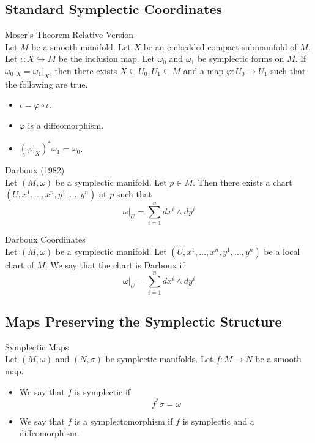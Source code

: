 \documentclass[a4paper]{article}
\begin{document}
\subsection{Standard Symplectic Coordinates}
\begin{thm}{Moser's Theorem Relative Version}{}\\
Let $M$ be a smooth manifold. Let $X$ be an embedded compact submanifold of $M$. Let $\iota:X\hookrightarrow M$ be the inclusion map. Let $\omega_0$ and $\omega_1$ be symplectic forms on $M$. If $\omega_0|_X=\omega_1|_X$, then there exists $X\subseteq U_0,U_1\subseteq M$ and a map $\varphi:U_0\to U_1$ such that the following are true. 
\begin{itemize}
\item $\iota=\varphi\circ\iota$. 
\item $\varphi$ is a diffeomorphism. 
\item $(\varphi|_X)^\ast\omega_1=\omega_0$. 
\end{itemize}
\end{thm}

\begin{thm}{Darboux (1982)}{}\\
Let $(M,\omega)$ be a symplectic manifold. Let $p\in M$. Then there exists a chart $(U,x^1,\dots,x^n,y^1,\dots,y^n)$ at $p$ such that $$\omega|_U=\sum_{i=1}^ndx^i\wedge dy^i$$
\end{thm}

\begin{defn}{Darboux Coordinates}{}\\
Let $(M,\omega)$ be a symplectic manifold. Let $(U,x^1,\dots,x^n,y^1,\dots,y^n)$ be a local chart of $M$. We say that the chart is Darboux if $$\omega|_U=\sum_{i=1}^ndx^i\wedge dy^i$$
\end{defn}

\subsection{Maps Preserving the Symplectic Structure}
\begin{defn}{Symplectic Maps}{}\\
Let $(M,\omega)$ and $(N,\sigma)$ be symplectic manifolds. Let $f:M\to N$ be a smooth map. 
\begin{itemize}
\item We say that $f$ is symplectic if $$f^\ast\sigma=\omega$$
\item We say that $f$ is a symplectomorphism if $f$ is symplectic and a diffeomorphism. 
\end{itemize}
\end{defn}
\end{document}
